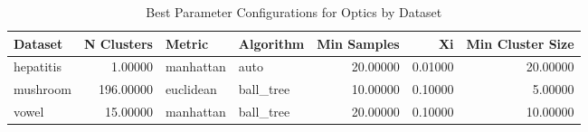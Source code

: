 \begin{table*}[ht!]
\caption{Best Parameter Configurations for Optics by Dataset}
\label{tab:best_configs_optics_config}
\begin{tabular}{lrllrrr}
Dataset & N Clusters & Metric & Algorithm & Min Samples & Xi & Min Cluster Size \\\midrule

hepatitis & 1.00000 & manhattan & auto & 20.00000 & 0.01000 & 20.00000 \\
mushroom & 196.00000 & euclidean & ball\_tree & 10.00000 & 0.10000 & 5.00000 \\
vowel & 15.00000 & manhattan & ball\_tree & 20.00000 & 0.10000 & 10.00000 \\
\end{tabular}
\end{table*}
